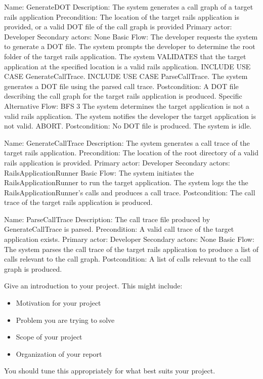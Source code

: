 	Name: GenerateDOT
	Description: The system generates a call graph of a target rails application
	Precondition: The location of the target rails application is provided, or a valid DOT file of the call graph is provided
	Primary actor: Developer
	Secondary actors: None
	Basic Flow:
	The developer requests the system to generate a DOT file.
	The system prompts the developer to determine the root folder of the target rails application.
	The system VALIDATES that the target application at the specified location is a valid rails application.
	INCLUDE USE CASE GenerateCallTrace.
	INCLUDE USE CASE ParseCallTrace.
	The system generates a DOT file using the parsed call trace.
	Postcondition: A DOT file describing the call graph for the target rails application is produced.
	Specific Alternative Flow: BFS 3
	The system determines the target application is not a valid rails application.
	The system notifies the developer the target application is not valid.
	ABORT.
	Postcondition: No DOT file is produced. The system is idle.

	Name: GenerateCallTrace
	Description: The system generates a call trace of the target rails application.
	Precondition: The location of the root directory of a valid rails application is provided.
	Primary actor: Developer
	Secondary actors: RailsApplicationRunner
	Basic Flow:
	The system initiates the RailsApplicationRunner to run the target application.
	The system logs the the RailsApplicationRunner’s calls and produces a call trace.
	Postcondition: The call trace of the target rails application is produced.


	Name: ParseCallTrace
	Description: The call trace file produced by GenerateCallTrace is parsed.
	Precondition: A valid call trace of the target application exists.
	Primary actor: Developer
	Secondary actors: None
	Basic Flow: 
	The system parses the call trace of the target rails application to produce a list of calls relevant to the call graph.
	Postcondition: A list of calls relevant to the call graph is produced.

Give an introduction to your project.  This might include:
\begin{itemize}
	\item Motivation for your project
	\item Problem you are trying to solve
	\item Scope of your project
	\item Organization of your report
\end{itemize}
You should tune this appropriately for what best suits your project.
